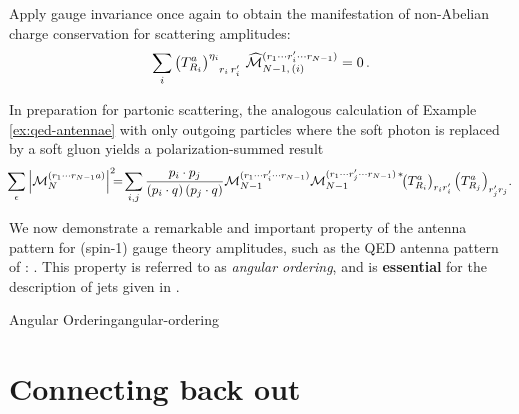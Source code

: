 \begin{exercise}
    Apply gauge invariance once again to obtain the manifestation of non-Abelian charge conservation for scattering amplitudes:
    \begin{align}
        \sum_{i}
        \le(T^a_{R_i}\ri)\indices{^{\eta_i}_{r_i\,r'_i}}
        \,
        \widehat{\mathcal{M}}
        ^{(r_1\cdots r'_i\cdots r_{N-1})}
        _{N-1,\,(i)}
        =
        0
        \,.
    \end{align}
\end{exercise}

\begin{exercise}
    In preparation for partonic scattering, the analogous calculation of Example \ref{ex:qed-antennae} with only outgoing particles where the soft photon is replaced by a soft gluon yields a polarization-summed result
    \begin{align}
        \hspace{-2pt}
        \sum_{\epsilon}
        \abs{\mathcal{M}_N^{(r_1\cdots r_{N-1}a)}}^2
        \!\!\!
        =
        \!
        \sum_{i, j}
        \frac{p_i \cdot p_j}
            {\le(p_i\cdot q\ri)\le(p_j \cdot q\ri)}
        \mathcal{M}_{N-1}^{(r_1\cdots r'_i \cdots r_{N-1})}
        \mathcal{M}_{N-1}^{(r_1\cdots r'_j \cdots r_{N-1})\,*}
        \!\!
        \le(T^a_{R_i}\ri)_{r_i r'_i}
        \le(T^a_{R_j}\ri)_{r'_j r_j}
        \!
        .
    \end{align}
\end{exercise}


We now demonstrate a remarkable and important property of the antenna pattern for (spin-1) gauge theory amplitudes, such as the QED antenna pattern of :
%
.
%
This property is referred to as \textit{angular ordering}, and is \textbf{essential} for the description of jets given in .


\begin{proposition}{Angular Ordering}{angular-ordering}
\end{proposition}





\section{Connecting back out}

